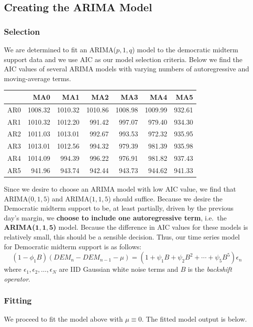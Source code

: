 \documentclass[]{article}
\begin{document}
\subsection{Creating the ARIMA Model}\label{creating-the-arima-model}

\subsubsection{Selection}\label{selection}

We are determined to fit an ARIMA(\(p,1,q\)) model to the democratic
midterm support data and we use AIC as our model selection criteria.
Below we find the AIC values of several ARIMA models with varying
numbers of autoregressive and moving-average terms.

\begin{longtable}[]{@{}lrrrrrr@{}}
\toprule
& MA0 & MA1 & MA2 & MA3 & MA4 & MA5\tabularnewline
\midrule
\endhead
 AR0 & 1008.32 & 1010.32 & 1010.86 & 1008.98 & 1009.99 &
932.61\tabularnewline
 AR1 & 1010.32 & 1012.20 & 991.42 & 997.07 & 979.40 &
934.30\tabularnewline
 AR2 & 1011.03 & 1013.01 & 992.67 & 993.53 & 972.32 &
935.95\tabularnewline
 AR3 & 1013.01 & 1012.56 & 994.32 & 979.39 & 981.39 &
935.98\tabularnewline
 AR4 & 1014.09 & 994.39 & 996.22 & 976.91 & 981.82 &
937.43\tabularnewline
 AR5 & 941.96 & 943.74 & 942.44 & 943.73 & 944.62 &
941.33\tabularnewline
\bottomrule
\end{longtable}

Since we desire to choose an ARIMA model with low AIC value, we find
that ARIMA(\(0,1,5\)) and ARIMA(\(1,1,5\)) should suffice. Because we
desire the Democratic midterm support to be, at least partially, driven
by the previous day's margin, we \textbf{choose to include one
autoregressive term}, i.e.~the \textbf{ARIMA(\(\boldsymbol{1,1,5}\))}
model. Because the difference in AIC values for these models is
relatively small, this should be a sensible decision. Thus, our time
series model for Democratic midterm support is as follows:
\[(1-\phi_1B)(DEM_n-DEM_{n-1} - \mu) = (1+\psi_1B + \psi_2B^2 + \cdots +\psi_5B^5)\epsilon_n \]
where \(\epsilon_1,\epsilon_2,\dots ,\epsilon_N\) are IID Gaussian white
noise terms and \(B\) is the \emph{backshift operator}.

\subsubsection{Fitting}\label{fitting}

We proceed to fit the model above with \(\mu\equiv 0\). The fitted model
output is below.
\end{document}
